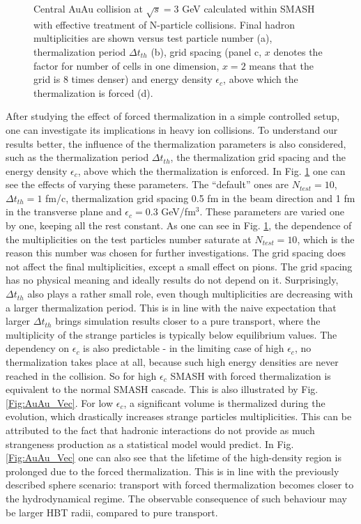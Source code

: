 \begin{figure}
  \caption{Central AuAu collision at $\sqrt{s} = 3$ GeV calculated within SMASH
           with effective treatment of N-particle collisions. Final hadron multiplicities
           are shown versus test particle number (a), thermalization period $\Delta
           t_{th}$ (b), grid spacing (panel c, $x$ denotes the factor for number of cells
           in one dimension, $x = 2$ means that the grid is 8 times denser) and energy
           density $\epsilon_c$, above which the thermalization is forced (d).}
  \label{Fig:AuAu_param}
\end{figure}


After studying the effect of forced thermalization in a simple controlled
setup, one can investigate its implications in heavy ion collisions. To understand
our results better, the influence of the thermalization
parameters is also considered, such as the thermalization period $\Delta t_{th}$, the
thermalization grid spacing and the energy density $\epsilon_c$, above which
the thermalization is enforced. In Fig. \ref{Fig:AuAu_param} one can see the
effects of varying these parameters. The ``default'' ones are $N_{test} = 10$, $\Delta
t_{th} = 1$ fm/c, thermalization grid spacing 0.5 fm in the beam direction and 1 fm in
the transverse plane and $\epsilon_c = 0.3$ GeV/fm$^3$. These parameters are varied
one by one, keeping all the rest constant. As one can see in Fig.
\ref{Fig:AuAu_param}, the dependence of the multiplicities on the test
particles number saturate at $N_{test} = 10$, which is the reason this
number was chosen for further investigations. The grid spacing does not affect the
final multiplicities, except a small effect on pions. The grid spacing has no
physical meaning and ideally results do not depend on it. Surprisingly, $\Delta
t_{th}$ also plays a rather small role, even though multiplicities are
decreasing with a larger thermalization period. This is in line with the naive expectation
that larger $\Delta t_{th}$ brings simulation results closer to a pure transport, where
the multiplicity of the strange particles is typically below equilibrium values. The dependency
on $\epsilon_c$ is also predictable - in the limiting case of high $\epsilon_c$,
no thermalization takes place at all, because such high energy densities are
never reached in the collision. So for high $\epsilon_c$ SMASH with forced
thermalization is equivalent to the normal SMASH cascade. This is also
illustrated by Fig. \ref{Fig:AuAu_Vec}. For low $\epsilon_c$, a significant
volume is thermalized during the evolution, which drastically increases strange
particles multiplicities. This can be attributed to the fact that hadronic
interactions do not provide as much strangeness production as a statistical
model would predict. In Fig. \ref{Fig:AuAu_Vec} one can also see that the
lifetime of the high-density region is prolonged due to the forced
thermalization. This is in line with the previously described sphere scenario:
transport with forced thermalization becomes closer to the hydrodynamical
regime. The observable consequence of such behaviour may be larger HBT radii,
compared to pure transport.

